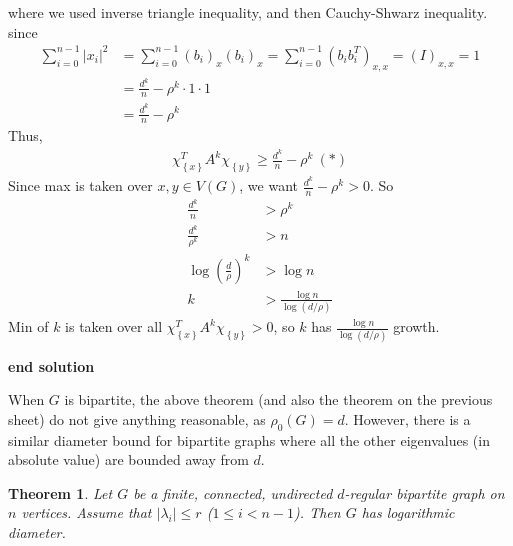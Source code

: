 \documentclass[12pt]{article}%
\newtheorem{theorem}{Theorem}
\begin{document}
   where we used inverse triangle inequality, and then Cauchy-Shwarz inequality. \\
   since 
   \begin{align}
       \sum_{i=0}^{n-1} \lvert x_i \rvert^2 &=
       \sum_{i=0}^{n-1} (b_i)_x (b_i)_x =  
       \sum_{i=0}^{n-1} \left( b_i b_i^T \right)_{x,x}
       = (I)_{x,x} = 1 \\
       &= \frac{ d^k }{ n } - \rho^k \cdot 1 \cdot 1\\
       &= \frac{ d^k }{ n } - \rho^k
   \end{align}
   Thus,
   \begin{align}
       \chi_{\left\{ x \right\}}^T A^k \chi_{\left\{ y \right\}}
       \geq \frac{ d^k }{ n } - \rho^k \ (*)
   \end{align}
   Since max is taken over $x,y \in V(G)$, we want 
   $\frac{ d^k }{ n } - \rho^k > 0$. So
   \begin{align}
       \frac{ d^k }{ n } &> \rho^k \\
       \frac{ d^k }{ \rho^k } &> n \\
       \log \left( \frac{ d }{ \rho }\right)^k &> \log n\\
       k &> \frac{ \log n }{ \log \left( d/ \rho \right) }
   \end{align}
   Min of $k$ is taken over all
   $\chi_{\left\{ x\right\}}^T A^k \chi_{\left\{ y\right\}} > 0$,
   so $k$ has $\frac{ \log n  }{ \log \left(d/\rho \right) }$ growth.
    
    \textbf{end solution}

When $G$ is bipartite, the above theorem (and also the theorem on the
previous sheet) do not give anything reasonable, as $\rho_{0}(G)=d$.
However, there is a similar diameter bound for bipartite graphs where all
the other eigenvalues (in absolute value) are bounded away from $d$.

\begin{theorem}
Let $G$ be a finite, connected, undirected $d$-regular bipartite graph on $n$ vertices. 
Assume that $\left\vert \lambda_{i}\right\vert \leq r$ ($1\leq i<n-1$). 
Then $G$ has logarithmic diameter.
\end{theorem}
\end{document}
